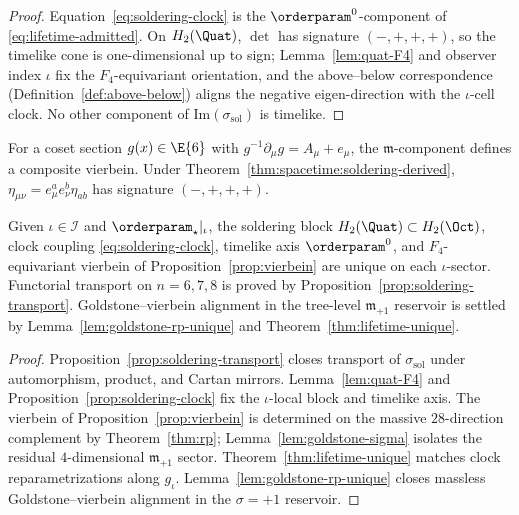 \begin{proof}
Equation~\eqref{eq:soldering-clock} is the $\orderparam^0$-component of
\eqref{eq:lifetime-admitted}. On $H_2(\Quat)$, $\det$ has signature
$(-,+,+,+)$, so the timelike cone is one-dimensional up to sign;
Lemma~\ref{lem:quat-F4} and observer index $\iota$ fix the
$F_4$-equivariant orientation, and the above--below correspondence
(Definition~\ref{def:above-below}) aligns the negative eigen-direction
with the $\iota$-cell clock. No other component of
$\mathrm{Im}(\sigma_{\mathrm{sol}})$ is timelike.
\end{proof}

\begin{proposition}\label{prop:vierbein}
For a coset section $g(x)\in\E{6}$ with $g^{-1}\partial_\mu g=A_\mu+e_\mu$,
the $\mathfrak{m}$-component defines a composite vierbein. Under
Theorem~\ref{thm:spacetime:soldering-derived},
$\eta_{\mu\nu}=e^a_\mu e^b_\nu\eta_{ab}$ has signature $(-,+,+,+)$.
\end{proposition}

\begin{theorem}
\label{thm:soldering-unique}
Given $\iota\in\mathcal{I}$ and $\orderparam_\star|_\iota$, the soldering
block $H_2(\Quat)\subset H_2(\Oct)$, clock coupling
\eqref{eq:soldering-clock}, timelike axis $\orderparam^0$, and
$F_4$-equivariant vierbein of Proposition~\ref{prop:vierbein} are unique on
each $\iota$-sector. Functorial transport on $n=6,7,8$ is proved by
Proposition~\ref{prop:soldering-transport}. Goldstone--vierbein alignment in
the tree-level $\mathfrak{m}_{+1}$ reservoir is settled by
Lemma~\ref{lem:goldstone-rp-unique} and
Theorem~\ref{thm:lifetime-unique}.
\end{theorem}

\begin{proof}
Proposition~\ref{prop:soldering-transport} closes transport of
$\sigma_{\mathrm{sol}}$ under automorphism, product, and Cartan mirrors.
Lemma~\ref{lem:quat-F4} and Proposition~\ref{prop:soldering-clock} fix the
$\iota$-local block and timelike axis. The vierbein of
Proposition~\ref{prop:vierbein} is determined on the massive $28$-direction
complement by Theorem~\ref{thm:rp}; Lemma~\ref{lem:goldstone-sigma}
isolates the residual $4$-dimensional $\mathfrak{m}_{+1}$ sector.
Theorem~\ref{thm:lifetime-unique} matches clock reparametrizations along
$g_\iota$. Lemma~\ref{lem:goldstone-rp-unique} closes massless
Goldstone--vierbein alignment in the $\sigma=+1$ reservoir.
\end{proof}

